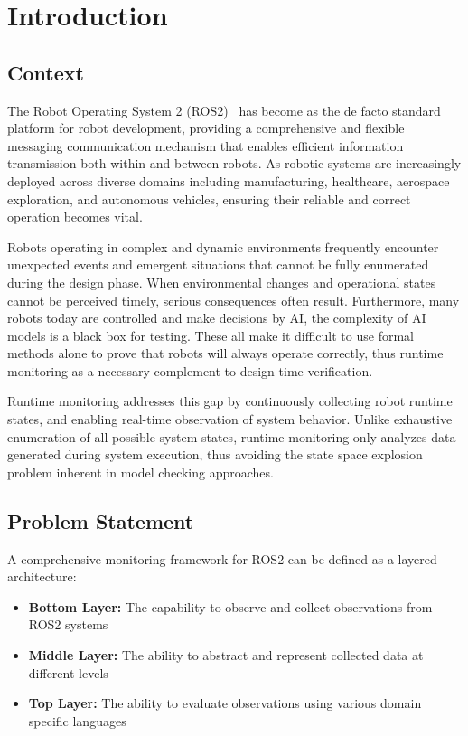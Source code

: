 \section{Introduction}
\label{ch:introduction}

\subsection{Context}

The Robot Operating System 2 (ROS2)~\cite{macenski2022ros2} has become as the de facto standard platform for robot development, providing a comprehensive and flexible messaging communication mechanism that enables efficient information transmission both within and between robots. As robotic systems are increasingly deployed across diverse domains including manufacturing, healthcare, aerospace exploration, and autonomous vehicles, ensuring their reliable and correct operation becomes vital.

Robots operating in complex and dynamic environments frequently encounter unexpected events and emergent situations that cannot be fully enumerated during the design phase. When environmental changes and operational states cannot be perceived timely, serious consequences often result. Furthermore, many robots today are controlled and make decisions by AI, the complexity of AI models is a black box for testing. These all make it difficult to use formal methods alone to prove that robots will always operate correctly, thus runtime monitoring as a necessary complement to design-time verification.

Runtime monitoring addresses this gap by continuously collecting robot runtime states, and enabling real-time observation of system behavior. Unlike exhaustive enumeration of all possible system states, runtime monitoring only analyzes data generated during system execution, thus avoiding the state space explosion problem inherent in model checking approaches.

\subsection{Problem Statement}

A comprehensive monitoring framework for ROS2 can be defined as a layered architecture:

\begin{itemize}[leftmargin=*]
    \item \textbf{Bottom Layer:} The capability to observe and collect observations from ROS2 systems
    \item \textbf{Middle Layer:} The ability to abstract and represent collected data at different levels
    \item \textbf{Top Layer:} The ability to evaluate observations using various domain specific languages
\end{itemize}

